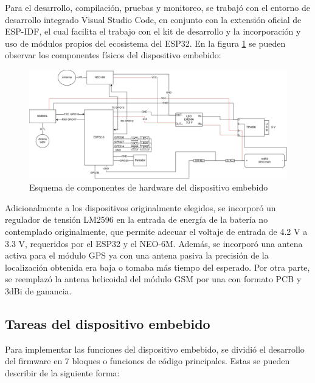 Para el desarrollo, compilación, pruebas y monitoreo, se trabajó con el entorno de desarrollo integrado Visual Studio Code, en conjunto con la extensión oficial de ESP-IDF, el cual facilita el trabajo con el kit de desarrollo y la incorporación y uso de módulos propios del ecosistema del ESP32. En la figura \ref{fig:esp32:diagrama} se pueden observar los componentes físicos del dispositivo embebido:


\begin{figure}[H]
	\centering
	\includegraphics[width=1\textwidth]{./Figures/esp32-arquitectura.png}
	\caption{Esquema de componentes de hardware del dispositivo embebido}
	\label{fig:esp32:diagrama}
\end{figure}

Adicionalmente a los dispositivos originalmente elegidos, se incorporó un regulador de tensión LM2596 en la entrada de energía de la batería no contemplado originalmente, que permite adecuar el voltaje de entrada de 4.2 V a 3.3 V\citep{LM2596:1}, requeridos por el ESP32 y el NEO-6M. Además, se incorporó una antena activa para el módulo GPS ya con una antena pasiva la precisión de la localización obtenida era baja o tomaba más tiempo del esperado. Por otra parte, se reemplazó la antena helicoidal del módulo GSM por una con formato PCB y 3dBi de ganancia.


\subsection{Tareas del dispositivo embebido}

Para implementar las funciones del dispositivo embebido, se dividió el desarrollo del firmware en 7 bloques o funciones de código principales. Estas se pueden describir de la siguiente forma:

